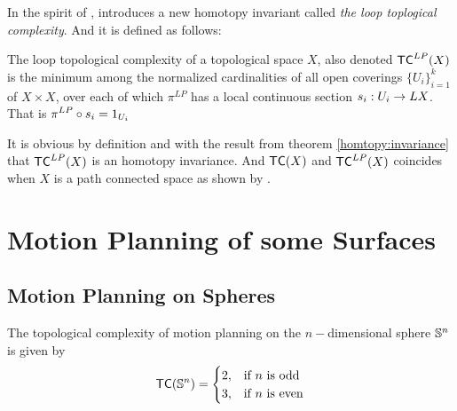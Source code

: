 In the spirit of \cite{farber2003topological}, \cite{derfoufi2015loop} introduces a new homotopy invariant called \textit{the loop toplogical complexity}. 
And it is defined as follows:

\begin{defn}
    The loop topological complexity of a topological space $X$, also denoted $\textsf{TC}^{LP}(X)$ is the minimum among the normalized cardinalities of all
    open coverings $\{U_i\}_{i = 1}^k$ of $X \times X$, over each of which $\pi^{LP}$ has a local continuous section $s_i : U_i \rightarrow LX$. 
    That is $\displaystyle \pi^{LP} \circ s_i = 1_{U_i}$
\end{defn}

It is obvious by definition and with the result from theorem \ref{homtopy:invariance} that $\textsf{TC}^{LP}(X)$ is an homotopy invariance. 
And $\textsf{TC}(X)$ and $\textsf{TC}^{LP}(X)$ coincides when $X$ is a path connected space as shown by \cite{derfoufi2015loop}.


\section{Motion Planning of some Surfaces}

\subsection{Motion Planning on Spheres}
\begin{thm}\label{tcomp-of-sphere}
    The topological complexity of motion planning on the $n-$dimensional sphere $\mathbb{S}^n$ is given by
    \[
        \textsf{TC}(\mathbb{S}^n) = \begin{cases}
            2, & \text{if $n$ is odd}  \\
            3, & \text{if $n$ is even} \\
        \end{cases}
    \]
\end{thm}

